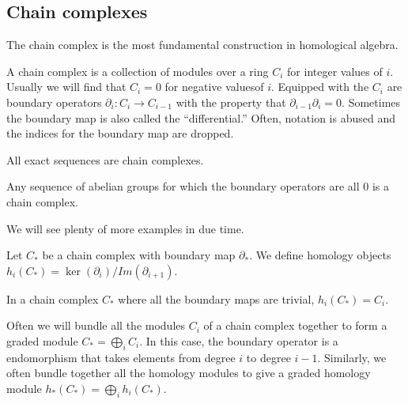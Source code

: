 \subsection{Chain complexes}
The chain complex is the most fundamental construction in
homological algebra.
\begin{definition} A chain complex is a collection of modules
over a ring $C_i$
for integer values of $i$. Usually we will find that $C_i=0$ for
negative valuesof $i$. Equipped with the $C_i$ are boundary
operators
$\partial_i:C_i\rightarrow C_{i-1}$ with the property that
$\partial_{i-1}\partial_i=0$. Sometimes the boundary map is also
called the
``differential.'' Often, notation is abused and the indices for
the boundary map are dropped.\end{definition}
\begin{example} All exact sequences are chain complexes.
\end{example}
\begin{example} Any sequence of abelian groups for which the
boundary operators
are all $0$ is a chain complex. \end{example}
We will see plenty of more examples in due time. 
\begin{definition} Let $C_*$ be a chain complex with boundary
map $\partial_*$.
We define homology objects
$h_i(C_*)=\ker(\partial_i)/Im(\partial_{i+1})$.
\end{definition}
\begin{example} In a chain complex $C_*$ where all the boundary
maps are
trivial, $h_i(C_*)=C_i$. \end{example}

Often we will bundle all the modules $C_i$ of a chain complex
together to form a graded module $C_*=\bigoplus_i C_i$. In this
case, the boundary operator is a
endomorphism that takes elements from degree $i$ to degree
$i-1$. Similarly, we
often bundle together all the homology modules to give a graded
homology module
$h_*(C_*)=\bigoplus_i h_i(C_*)$.


